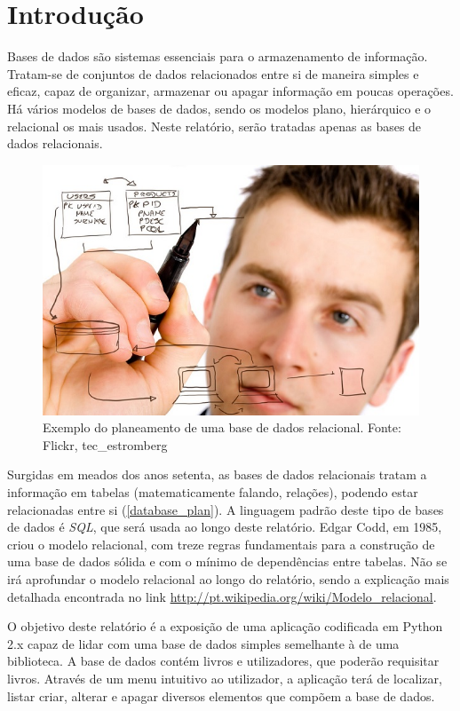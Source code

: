 \documentclass[11pt,openany,twoside]{report}
\begin{document}
\chapter{Introdução}

Bases de dados são sistemas essenciais para o armazenamento de informação. Tratam-se de conjuntos de dados relacionados entre si de maneira simples e eficaz, capaz de organizar, armazenar ou apagar informação em poucas operações. Há vários modelos de bases de dados, sendo os modelos plano, hierárquico e o relacional os mais usados. Neste relatório, serão tratadas apenas as bases de dados relacionais.

\begin{figure}
 \center
 \includegraphics[scale=1.5]{database_plan.jpg}
 \caption{Exemplo do planeamento de uma base de dados relacional. Fonte: Flickr, tec\_estromberg}
 \label{database_plan}
\end{figure}

Surgidas em meados dos anos setenta, as bases de dados relacionais tratam a informação em tabelas (matematicamente falando, relações), podendo estar relacionadas entre si (\autoref{database_plan}). A linguagem padrão deste tipo de bases de dados é \textit{SQL}, que será usada ao longo deste relatório. Edgar Codd, em 1985, criou o modelo relacional, com treze regras fundamentais para a construção de uma base de dados sólida e com o mínimo de dependências entre tabelas. Não se irá aprofundar o modelo relacional ao longo do relatório, sendo a explicação mais detalhada encontrada no link \url{http://pt.wikipedia.org/wiki/Modelo\_relacional}.

O objetivo deste relatório é a exposição de uma aplicação codificada em Python 2.x capaz de lidar com uma base de dados simples semelhante à de uma biblioteca. A base de dados contém livros e utilizadores, que poderão requisitar livros. Através de um menu intuitivo ao utilizador, a aplicação terá de localizar, listar criar, alterar e apagar diversos elementos que compõem a base de dados.
\end{document}
